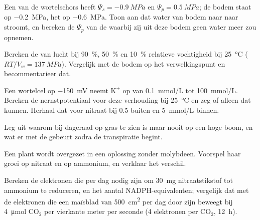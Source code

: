 \begin{exercise}[$\star\star$]\label{exo:b1:plant-water-minerals:5}
Een  van de wortelschors heeft $\Psi_s = \qty{-0.9}{MPa}$ en $\Psi_p =
\qty{0.5}{MPa}$; de bodem staat op \qty{-0.2}{MPa}, het  op
\qty{-0.6}{MPa}. Toon aan dat water van bodem naar  naar  stroomt,
en bereken de $\Psi_p$ van de  waarbij zij uit deze bodem geen water
meer zou opnemen.
\end{exercise}

\begin{exercise}[$\star\star$]\label{exo:b1:plant-water-minerals:6}
Bereken de  van lucht bij \qty{90}{\%}, \qty{50}{\%} en
\qty{10}{\%} relatieve vochtigheid bij \qty{25}{\celsius} ($RT/V_w =
\qty{137}{MPa}$). Vergelijk met de bodem op het verwelkingspunt en
becommentarieer dat.
\end{exercise}

\begin{exercise}[$\star\star$]\label{exo:b1:plant-water-minerals:7}
Een wortelcel op \qty{-150}{mV} neemt $\mathrm{K^+}$ op van
\qty{0.1}{mmol/L} tot \qty{100}{mmol/L}. Bereken de nernstpotentiaal voor
deze verhouding bij \qty{25}{\celsius} en zeg of  alleen dat kunnen.
Herhaal dat voor nitraat bij \qty{0.5}{} buiten en \qty{5}{mmol/L} binnen.
\end{exercise}

\begin{exercise}[$\star\star$]\label{exo:b1:plant-water-minerals:8}
Leg uit waarom  bij dageraad op gras te zien is maar nooit op een
hoge boom, en wat er met de  gebeurt zodra de transpiratie begint.
\end{exercise}

\begin{exercise}[$\star\star$]\label{exo:b1:plant-water-minerals:9}
Een plant wordt overgezet in een oplossing zonder molybdeen. Voorspel haar
groei op nitraat en op ammonium, en verklaar het verschil.
\end{exercise}

\begin{exercise}[$\star\star\star$]\label{exo:b1:plant-water-minerals:10}
Bereken de elektronen die per dag nodig zijn om \qty{30}{mg}
nitraatstikstof tot ammonium te reduceren, en het aantal NADPH-equivalenten;
vergelijk dat met de elektronen die een maïsblad van \qty{500}{cm^2} per
dag door zijn  beweegt bij \qty{4}{\micro mol}
$\mathrm{CO_2}$ per vierkante meter per seconde (4 elektronen per
$\mathrm{CO_2}$, \qty{12}{h}).
\end{exercise}

